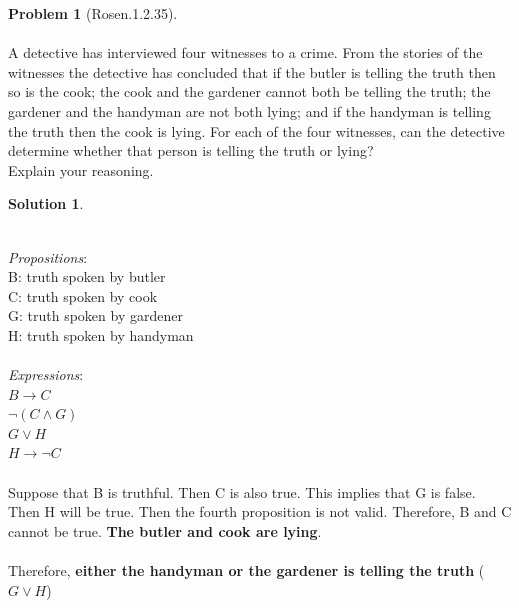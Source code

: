 \documentclass{article}
\theoremstyle{definition}
\newtheorem*{problem}{Problem}
\newtheorem*{solution}{Solution}
\begin{document}
\begin{problem}[Rosen.1.2.35]\ \\
\ \\
A detective has interviewed four witnesses to a crime.
From the stories of the witnesses the detective has concluded
that if the butler is telling the truth then so is the
cook; the cook and the gardener cannot both be telling the
truth; the gardener and the handyman are not both lying;
and if the handyman is telling the truth then the cook is
lying. For each of the four witnesses, can the detective determine
whether that person is telling the truth or lying?\ \\
Explain your reasoning.\ \\
\begin{compactenum}
\renewcommand{\theenumi}{\alph{enumi}}
\end{compactenum}
\end{problem}

\begin{solution}\ \\
\ \\
\begin{compactenum}
\renewcommand{\theenumi}{\alph{enumi}} 
\textit{Propositions}:\ \\
B: truth spoken by butler\ \\
C: truth spoken by cook\ \\
G: truth spoken by gardener\ \\
H: truth spoken by handyman\ \\
\ \\
\textit{Expressions}:\ \\
$B \rightarrow C $\ \\
$\neg(C \wedge G) $\ \\
$G \vee H$\ \\
$H \rightarrow \neg C$\ \\
\ \\
Suppose that B is truthful. Then C is also true. This implies that G is false. Then H will be true. Then the fourth proposition is not valid. Therefore, B and C cannot be true. \textbf{The butler and cook are lying}.\ \\
\ \\
Therefore, \textbf{either the handyman or the gardener is telling the truth} ( $G \vee H$)
\ \\




\end{compactenum}
\end{solution}
\end{document}
